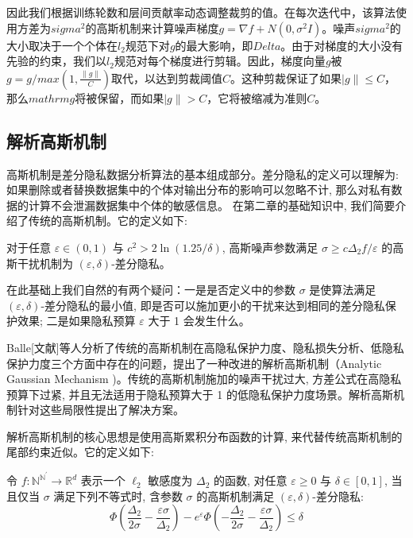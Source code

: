 因此我们根据训练轮数和层间贡献率动态调整裁剪的值。在每次迭代中，该算法使用方差为$sigma^{2}$的高斯机制来计算噪声梯度$g=\nabla f+N\left(0, \sigma^{2} I\right)$。噪声$sigma^{2}$的大小取决于一个个体在$l_{2}$规范下对$g$的最大影响，即$Delta$。由于对梯度的大小没有先验的约束，我们以$l_{2}$规范对每个梯度进行剪辑。因此，梯度向量$g$被$g=g/max \left(1, \frac{\|g\|}{C}\right)$取代，以达到剪裁阈值$C$。这种剪裁保证了如果$|g\| \leq C$，那么$mathrm{g}$将被保留，而如果$|g\|>C$，它将被缩减为准则$C$。

\subsection{解析高斯机制}
高斯机制是差分隐私数据分析算法的基本组成部分。差分隐私的定义可以理解为: 如果删除或者替换数据集中的个体对输出分布的影响可以忽略不计, 那么对私有数据的计算不会泄漏数据集中个体的敏感信息。
在第二章的基础知识中, 我们简要介绍了传统的高斯机制。它的定义如下: 
\begin{define}\label{差分隐私高斯机制}
对于任意 $\varepsilon \in(0,1)$ 与 $c^{2}>2 \ln (1.25 / \delta)$, 高斯噪声参数满足 $\sigma \geq c \Delta_{2} f / \varepsilon$ 的高斯干扰机制为 $(\varepsilon, \delta)$-差分隐私。
\end{define}

在此基础上我们自然的有两个疑问：一是是否定义中的参数 $\sigma$ 是使算法满足 $(\varepsilon, \delta)$-差分隐私的最小值, 即是否可以施加更小的干扰来达到相同的差分隐私保护效果; 二是如果隐私预算 $\varepsilon$ 大于 1 会发生什么。

Balle[文献]等人分析了传统的高斯机制在高隐私保护力度、隐私损失分析、低隐私保护力度三个方面中存在的问题，提出了一种改进的解析高斯机制（Analytic Gaussian Mechanism )。传统的高斯机制施加的噪声干扰过大, 方差公式在高隐私预算下过紧, 并且无法适用于隐私预算大于 1 的低隐私保护力度场景。解析高斯机制针对这些局限性提出了解决方案。

解析高斯机制的核心思想是使用高斯累积分布函数的计算, 来代替传统高斯机制的尾部约束近似。它的定义如下:
\begin{define}\label{解析高斯机制}
令 $f: \mathbb{N}^{\mathbb{N}^{\prime}} \rightarrow \mathbb{R}^{d}$ 表示一个 $\ell_{2}$ 敏感度为 $\Delta_{2}$ 的函数, 对任意 $\varepsilon \geq 0$ 与 $\delta \in[0,1]$, 当且仅当 $\sigma$ 满足下列不等式时, 含参数 $\sigma$ 的高斯机制满足 $(\varepsilon, \delta)$-差分隐私:
\begin{equation}\label{eq:解析高斯机制}
\Phi\left(\frac{\Delta_{2}}{2 \sigma}-\frac{\varepsilon \sigma}{\Delta_{2}}\right)-e^{\varepsilon} \Phi\left(-\frac{\Delta_{2}}{2 \sigma}-\frac{\varepsilon \sigma}{\Delta_{2}}\right) \leq \delta
\end{equation}
\end{define}

